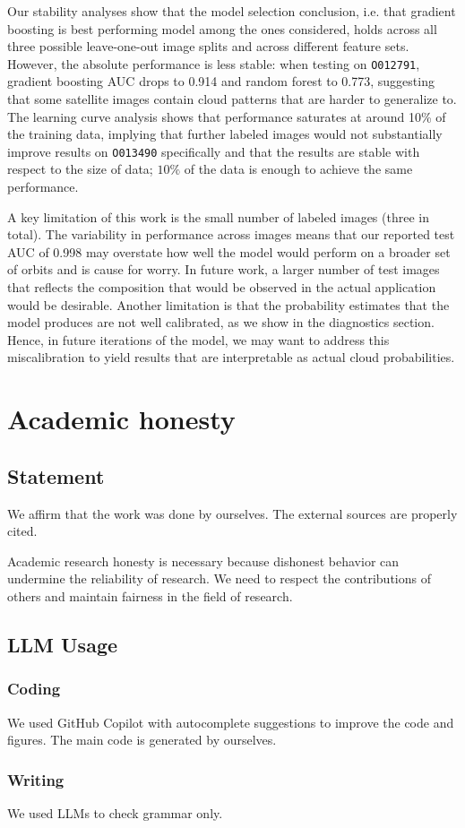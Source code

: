 \documentclass[10pt,letterpaper]{article}
\begin{document}
Our stability analyses show that the model selection conclusion, i.e. that gradient boosting is best performing model among the ones considered, holds across all three possible leave-one-out image splits and across different feature sets. However, the absolute performance is less stable: when testing on \texttt{O012791}, gradient boosting AUC drops to 0.914 and random forest to 0.773, suggesting that some satellite images contain cloud patterns that are harder to generalize to. The learning curve analysis shows that performance saturates at around 10\% of the training data, implying that further labeled images would not substantially improve results on \texttt{O013490} specifically and that the results are stable with respect to the size of data; $10\%$ of the data is enough to achieve the same performance.

A key limitation of this work is the small number of labeled images (three in total). The variability in performance across images means that our reported test AUC of 0.998 may overstate how well the model would perform on a broader set of orbits and is cause for worry. In future work, a larger number of test images that reflects the composition that would be observed in the actual application would be desirable. Another limitation is that the probability estimates that the model produces are not well calibrated, as we show in the diagnostics section. Hence, in future iterations of the model, we may want to address this miscalibration to yield results that are interpretable as actual cloud probabilities.




\newpage

\appendix

\section{Academic honesty}

\subsection{Statement}

We affirm that the work was done by ourselves. The external sources are properly cited.

Academic research honesty is necessary because dishonest behavior can undermine the reliability of research. We need to respect the contributions of others and maintain fairness in the field of research.

\subsection{LLM Usage}

\subsubsection*{Coding}
We used GitHub Copilot with  autocomplete suggestions to improve the code and figures. The main code is generated by ourselves.
\subsubsection*{Writing}

We used LLMs to check grammar only.
\end{document}
